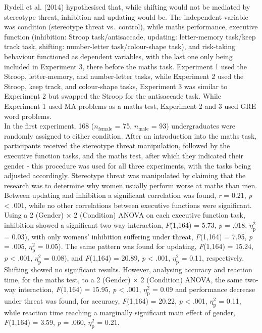 \documentclass[
  stu,floatsintext]{apa7}
\begin{document}
Rydell et al. (2014) hypothesised that, while shifting would not be mediated by stereotype threat, inhibition and updating would be.
The independent variable was condition (stereotype threat vs.~control), while maths performance, executive function (inhibition: Stroop task/antisaccade, updating: letter-memory task/keep track task, shifting: number-letter task/colour-shape task), and risk-taking behaviour functioned as dependent variables, with the last one only being included in Experiment 3, there before the maths task.
Experiment 1 used the Stroop, letter-memory, and number-letter tasks, while Experiment 2 used the Stroop, keep track, and colour-shape tasks, Experiment 3 was similar to Experiment 2 but swapped the Stroop for the antisaccade task.
While Experiment 1 used MA problems as a maths test, Experiment 2 and 3 used GRE word problems.\\
In the first experiment, 168 (\(n_{\text{female}}\) = 75, \(n_{\text{male}}\) = 93) undergraduates were randomly assigned to either condition.
After an introduction into the maths task, participants received the stereotype threat manipulation, followed by the executive function tasks, and the maths test, after which they indicated their gender - this procedure was used for all three experiments, with the tasks being adjusted accordingly.
Stereotype threat was manipulated by claiming that the research was to determine why women usually perform worse at maths than men.\\
Between updating and inhibition a significant correlation was found, \emph{r} = 0.21, \emph{p} \textless{} .001, while no other correlations between executive functions were significant.
Using a 2 (Gender) \(\times\) 2 (Condition) ANOVA on each executive function task, inhibition showed a significant two-way interaction, \emph{F}(1,164) = 5.73, \emph{p} = .018, \(\eta^{2}_{\text{p}}\) = 0.03), with only womens' inhibition suffering under threat, \emph{F}(1,164) = 7.95, \emph{p} = .005, \(\eta^{2}_{\text{p}}\) = 0.05).
The same pattern was found for updating, \emph{F}(1,164) = 15.24, \emph{p} \textless{} .001, \(\eta^{2}_{\text{p}}\) = 0.08), and \emph{F}(1,164) = 20.89, \emph{p} \textless{} .001, \(\eta^{2}_{\text{p}}\) = 0.11, respectively.
Shifting showed no significant results.
However, analysing accuracy and reaction time, for the maths test, to a 2 (Gender) \(\times\) 2 (Condition) ANOVA, the same two-way interaction, \emph{F}(1,164) = 15.95, \emph{p} \textless{} .001, \(\eta^{2}_{\text{p}}\) = 0.09 and performance decrease under threat was found, for accuracy, \emph{F}(1,164) = 20.22, \emph{p} \textless{} .001, \(\eta^{2}_{\text{p}}\) = 0.11, while reaction time reaching a marginally significant main effect of gender, \emph{F}(1,164) = 3.59, \emph{p} = .060, \(\eta^{2}_{\text{p}}\) = 0.21.
\end{document}
